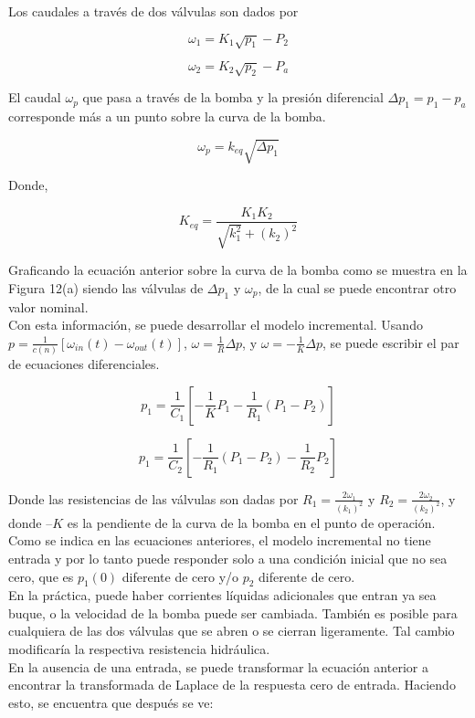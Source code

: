 \documentclass[a4paper,12pt,twoside]{proyectotanquesecci}
\begin{document}
Los caudales a través de dos válvulas son dados por

\begin{equation}
\omega _{1}=K_{1}\sqrt {p_{1}}-P_{2}
\end{equation}

\begin{equation}
\omega _{2}=K_{2}\sqrt {p_{2}}-P_{a}
\end{equation}


El caudal $\omega_{p}$ que pasa a través de la bomba y la presión diferencial $\Delta p_{1}=p_{1}-p_{a}$ corresponde más a un punto sobre la curva de la bomba.

\begin{equation}
\omega _{p}=k_{eq}\sqrt {\Delta p_{1}}
\end{equation}

Donde,

\begin{equation}
K_{eq}=\frac {K_{1}K_{2}}{\sqrt {k^{2}_{1}}+\left( k_{2}\right) ^{2}}
\end{equation}

Graficando la ecuación anterior sobre la curva de la bomba como se muestra en la Figura 12(a) siendo las válvulas de $\Delta p_{1}$ y $\omega_{p}$, de la cual se puede encontrar otro valor nominal. \\
Con esta información, se puede desarrollar el modelo incremental. Usando $p=\frac {1}{c\left( n\right) }\left[ \omega _{in}\left( t\right) -\omega _{out}\left( t\right) \right] $,  $\omega =\frac {1}{R}\Delta p$, y $\omega =-\frac {1}{K}\Delta p$, se puede escribir el par de ecuaciones diferenciales.

\begin{equation}
p_{1}=\frac {1}{C_{1}}\left[ -\frac {1}{K}P_{1}-\frac {1}{R_{1}}\left( P_{1}-P_{2}\right) \right] 
\end{equation}

\begin{equation}
p_{1}=\frac {1}{C_{2}}\left[ -\frac {1}{R_{1}}\left( P_{1}-P_{2}\right) -\frac {1}{R_{2}}P_{2}\right] 
\end{equation}

Donde las resistencias de las válvulas son dadas por $R_{1}=\frac {2\omega _{1}}{\left( k_{1}\right) ^{2}}$ y $R_{2}=\frac {2\omega _{2}}{\left( k_{2}\right) ^{2}}$, y donde $–K$ es la pendiente de la curva de la bomba en el punto de operación. Como se indica en las ecuaciones anteriores, el modelo incremental no tiene entrada y por lo tanto puede responder solo a una condición inicial que no sea cero, que es $p_{1}(0)$ diferente de cero y/o $p_{2}$ diferente de cero. \\
En la práctica, puede haber corrientes líquidas adicionales que entran ya sea buque, o la velocidad de la bomba puede ser cambiada. También es posible para cualquiera de las dos válvulas que se abren o se cierran ligeramente. Tal cambio modificaría la respectiva resistencia hidráulica. \\
En la ausencia de una entrada, se puede transformar la ecuación anterior a encontrar la transformada de Laplace de la respuesta cero de entrada. Haciendo esto, se encuentra que después se ve:
\end{document}
